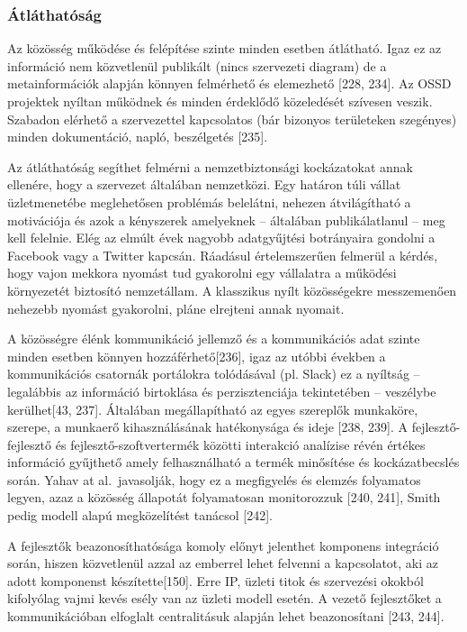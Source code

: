 \documentclass[12pt,magyar,a4paper,oneside]{scrreprt}
\begin{document}
\hypertarget{uxe1tluxe1thatuxf3suxe1g}{%
\subsubsection{Átláthatóság}\label{uxe1tluxe1thatuxf3suxe1g}}

Az közösség működése és felépítése szinte minden esetben átlátható. Igaz
ez az információ nem közvetlenül publikált (nincs szervezeti diagram) de
a metainformációk alapján könnyen felmérhető és elemezhető {[}228,
234{]}. Az OSSD projektek nyíltan működnek és minden érdeklődő
közeledését szívesen veszik. Szabadon elérhető a szervezettel
kapcsolatos (bár bizonyos területeken szegényes) minden dokumentáció,
napló, beszélgetés {[}235{]}.

Az átláthatóság segíthet felmérni a nemzetbiztonsági kockázatokat annak
ellenére, hogy a szervezet általában nemzetközi. Egy határon túli vállat
üzletmenetébe meglehetősen problémás belelátni, nehezen átvilágítható a
motivációja és azok a kényszerek amelyeknek -- általában publikálatlanul
-- meg kell felelnie. Elég az elmúlt évek nagyobb adatgyűjtési
botrányaira gondolni a Facebook vagy a Twitter kapcsán. Ráadásul
értelemszerűen felmerül a kérdés, hogy vajon mekkora nyomást tud
gyakorolni egy vállalatra a működési környezetét biztosító nemzetállam.
A klasszikus nyílt közösségekre messzemenően nehezebb nyomást
gyakorolni, pláne elrejteni annak nyomait.

A közösségre élénk kommunikáció jellemző és a kommunikációs adat szinte
minden esetben könnyen hozzáférhető{[}236{]}, igaz az utóbbi években a
kommunikációs csatornák portálokra tolódásával (pl. Slack) ez a nyíltság
-- legalábbis az információ birtoklása és perzisztenciája tekintetében
-- veszélybe kerülhet{[}43, 237{]}. Általában megállapítható az egyes
szereplők munkaköre, szerepe, a munkaerő kihasználásának hatékonysága és
ideje {[}238, 239{]}. A fejlesztő-fejlesztő és fejlesztő-szoftvertermék
közötti interakció analízise révén értékes információ gyűjthető amely
felhasználható a termék minősítése és kockázatbecslés során. Yahav at
al.~javasolják, hogy ez a megfigyelés és elemzés folyamatos legyen, azaz
a közösség állapotát folyamatosan monitorozzuk {[}240, 241{]}, Smith
pedig modell alapú megközelítést tanácsol {[}242{]}.

A fejlesztők beazonosíthatósága komoly előnyt jelenthet komponens
integráció során, hiszen közvetlenül azzal az emberrel lehet felvenni a
kapcsolatot, aki az adott komponenst készítette{[}150{]}. Erre IP,
üzleti titok és szervezési okokból kifolyólag vajmi kevés esély van az
üzleti modell esetén. A vezető fejlesztőket a kommunikációban elfoglalt
centralitásuk alapján lehet beazonosítani {[}243, 244{]}.
\end{document}
